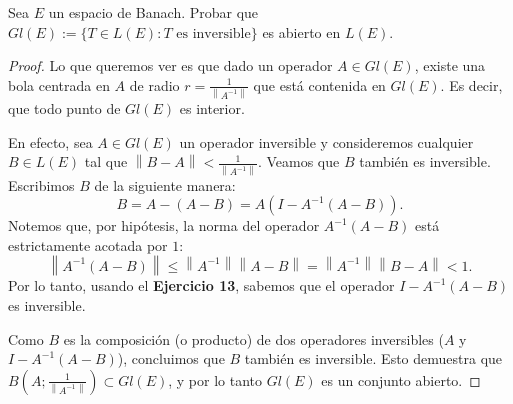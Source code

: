 \documentclass{article}
\theoremstyle{definition}
\newcommand{\norm}[1]{\left\lVert #1 \right\rVert}       %
\newcommand{\bola}[2]{B(#1;#2)}                           %
\newenvironment{ejercicio}[1]{\begin{trivlist}
\item[\hskip \labelsep {\bfseries Ejercicio}\hskip \labelsep {\bfseries #1.}]}{\end{trivlist}}
\begin{document}
\clearpage
\begin{ejercicio}{14}
    Sea \(E\) un espacio de Banach. Probar que \( Gl(E) := \{ T \in L(E) : T \text{ es inversible} \} \) es abierto en \(L(E)\).
\end{ejercicio}
\begin{proof}
    Lo que queremos ver es que dado un operador \(A \in Gl(E)\), existe una bola centrada en \(A\) de radio \(r = \frac{1}{\norm{A^{-1}}}\) que está contenida en \(Gl(E)\). Es decir, que todo punto de \(Gl(E)\) es interior.

    En efecto, sea \(A \in Gl(E)\) un operador inversible y consideremos cualquier \(B \in L(E)\) tal que \(\norm{B-A} < \frac{1}{\norm{A^{-1}}}\). Veamos que \(B\) también es inversible. Escribimos \(B\) de la siguiente manera:
    \[
        B = A - (A-B) = A(I - A^{-1}(A-B)).
    \]
    Notemos que, por hipótesis, la norma del operador \(A^{-1}(A-B)\) está estrictamente acotada por \( 1 \):
    \[
        \norm{A^{-1}(A-B)} \leq \norm{A^{-1}} \norm{A-B} = \norm{A^{-1}} \norm{B-A} < 1.
    \]
    Por lo tanto, usando el \textbf{Ejercicio 13}, sabemos que el operador \(I - A^{-1}(A-B)\) es inversible.

    Como \(B\) es la composición (o producto) de dos operadores inversibles (\( A \) y \( I - A^{-1}(A-B) \)), concluimos que \(B\) también es inversible. Esto demuestra que \( \bola{A}{\frac{1}{\norm{A^{-1}}}} \subset Gl(E) \), y por lo tanto \( Gl(E) \) es un conjunto abierto.
\end{proof}

\vspace{0.5cm}
\end{document}

